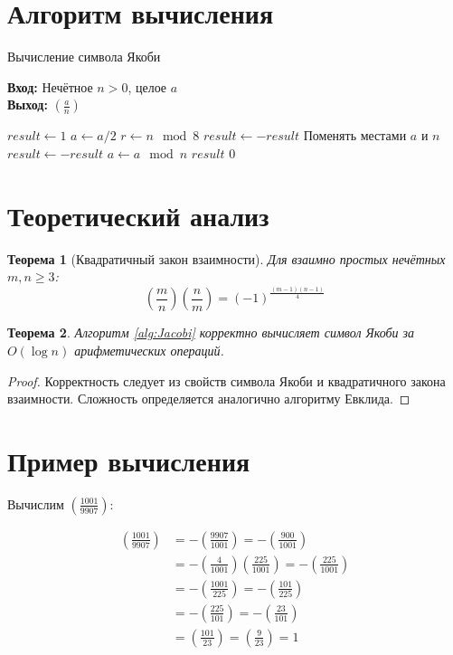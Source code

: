 \documentclass[12pt,a4paper]{article}
\newtheorem{theorem}{Теорема}
\begin{document}
\section{Алгоритм вычисления}

\begin{algorithm}[h]
\caption{Вычисление символа Якоби}
\label{alg:Jacobi}
\textbf{Вход:} Нечётное $n > 0$, целое $a$ \\
\textbf{Выход:} $\left(\frac{a}{n}\right)$

\begin{algorithmic}[1]
\State $result \gets 1$
        \State $a \gets a/2$
        \State $r \gets n \mod 8$
         $result \gets -result$ \EndIf
    \EndWhile
    \State Поменять местами $a$ и $n$
     $result \gets -result$ \EndIf
    \State $a \gets a \mod n$
\EndWhile
{} \Return $result$ \Else \Return $0$ \EndIf
\end{algorithmic}
\end{algorithm}

\section{Теоретический анализ}

\begin{theorem}[Квадратичный закон взаимности]
Для взаимно простых нечётных $m,n \geq 3$:
\[
\left(\frac{m}{n}\right)\left(\frac{n}{m}\right) = (-1)^{\frac{(m-1)(n-1)}{4}}
\]
\end{theorem}

\begin{theorem}
Алгоритм \ref{alg:Jacobi} корректно вычисляет символ Якоби за $O(\log n)$ арифметических операций.
\end{theorem}

\begin{proof}
Корректность следует из свойств символа Якоби и квадратичного закона взаимности. Сложность определяется аналогично алгоритму Евклида.
\end{proof}

\section{Пример вычисления}

Вычислим $\left(\frac{1001}{9907}\right)$:

\begin{align*}
\left(\frac{1001}{9907}\right) &= -\left(\frac{9907}{1001}\right) = -\left(\frac{900}{1001}\right) \\
&= -\left(\frac{4}{1001}\right)\left(\frac{225}{1001}\right) = -\left(\frac{225}{1001}\right) \\
&= -\left(\frac{1001}{225}\right) = -\left(\frac{101}{225}\right) \\
&= -\left(\frac{225}{101}\right) = -\left(\frac{23}{101}\right) \\
&= \left(\frac{101}{23}\right) = \left(\frac{9}{23}\right) = 1
\end{align*}
\end{document}

